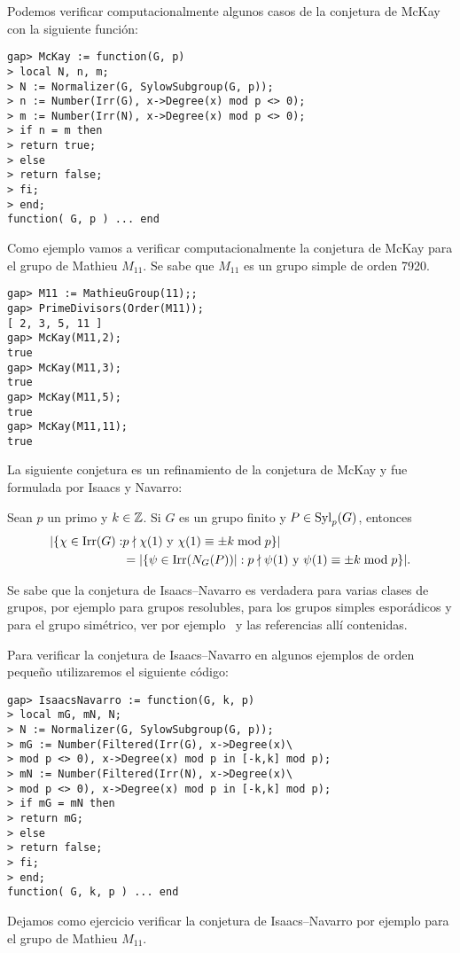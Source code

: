 Podemos verificar computacionalmente algunos casos
de la conjetura de McKay con la siguiente función:

\begin{lstlisting}
gap> McKay := function(G, p)
> local N, n, m;
> N := Normalizer(G, SylowSubgroup(G, p));
> n := Number(Irr(G), x->Degree(x) mod p <> 0);
> m := Number(Irr(N), x->Degree(x) mod p <> 0);
> if n = m then
> return true;
> else
> return false;
> fi;
> end;
function( G, p ) ... end
\end{lstlisting}

Como ejemplo vamos a verificar computacionalmente la conjetura de McKay para el grupo 
de Mathieu $M_{11}$. Se sabe que $M_{11}$ es un grupo simple de orden 7920. 

\begin{lstlisting}
gap> M11 := MathieuGroup(11);;
gap> PrimeDivisors(Order(M11));
[ 2, 3, 5, 11 ]
gap> McKay(M11,2);
true
gap> McKay(M11,3);
true
gap> McKay(M11,5);
true
gap> McKay(M11,11);
true
\end{lstlisting}

La siguiente conjetura 
es un refinamiento de la conjetura de McKay y 
fue formulada por Isaacs y Navarro:

\begin{conjecture}
Sean $p$ un primo y $k\in\mathbb{Z}$. 
Si $G$ es un grupo finito y $P\in\mathrm{Syl}_p(G)$, entonces
\begin{align*}
|\{\chi\in\operatorname{Irr}(G):&p\nmid \chi(1)\text{ y }\chi(1)\equiv\pm k\bmod p\}|\\
&=|\{\psi\in\operatorname{Irr}(N_G(P))|:p\nmid\psi(1)\text{ y }\psi(1)\equiv\pm k\bmod p\}|.
\end{align*}
\end{conjecture}

Se sabe que la conjetura de Isaacs--Navarro es verdadera para varias clases de grupos, por ejemplo 
para grupos resolubles, para los grupos simples esporádicos y para el grupo simétrico, 
ver por ejemplo~\cite{MR1935849} y las referencias allí contenidas. 

Para verificar la conjetura de Isaacs--Navarro en algunos
ejemplos de orden pequeño utilizaremos el siguiente código:

\begin{lstlisting}
gap> IsaacsNavarro := function(G, k, p)
> local mG, mN, N;
> N := Normalizer(G, SylowSubgroup(G, p));
> mG := Number(Filtered(Irr(G), x->Degree(x)\
> mod p <> 0), x->Degree(x) mod p in [-k,k] mod p);
> mN := Number(Filtered(Irr(N), x->Degree(x)\
> mod p <> 0), x->Degree(x) mod p in [-k,k] mod p);
> if mG = mN then
> return mG;
> else
> return false;
> fi;
> end;
function( G, k, p ) ... end
\end{lstlisting}

Dejamos como ejercicio verificar la conjetura de Isaacs--Navarro 
por ejemplo para el grupo de Mathieu $M_{11}$. 